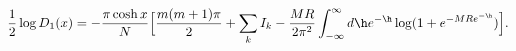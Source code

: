 \begin{equation}
\frac{1}{2}\log{D_1(x)}
= -\frac{\pi\cosh{x}}{N}
\Bigl[ \frac{m(m+1)\pi}{2} + \sum_{k} I_k
-\frac{MR}{2\pi^2}\int_{-\infty}^{\infty}
d\h e^{-\h} \log(1+e^{-MRe^{-\h}})\Bigr].
\end{equation}

